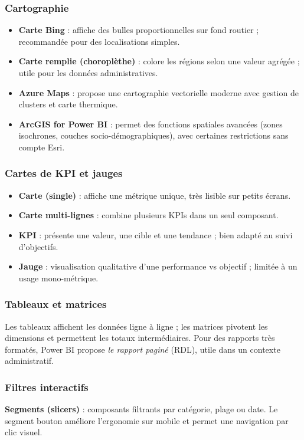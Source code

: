 \subsubsection{Cartographie}
\begin{itemize}
  \item \textbf{Carte Bing} : affiche des bulles proportionnelles sur fond routier ; recommandée pour des localisations simples.
  \item \textbf{Carte remplie (choroplèthe)} : colore les régions selon une valeur agrégée ; utile pour les données administratives.
  \item \textbf{Azure Maps} : propose une cartographie vectorielle moderne avec gestion de clusters et carte thermique.
  \item \textbf{ArcGIS for Power BI} : permet des fonctions spatiales avancées (zones isochrones, couches socio-démographiques), avec certaines restrictions sans compte Esri.
\end{itemize}

\subsubsection{Cartes de KPI et jauges}
\begin{itemize}
  \item \textbf{Carte (single)} : affiche une métrique unique, très lisible sur petits écrans.
  \item \textbf{Carte multi-lignes} : combine plusieurs KPIs dans un seul composant.
  \item \textbf{KPI} : présente une valeur, une cible et une tendance ; bien adapté au suivi d’objectifs.
  \item \textbf{Jauge} : visualisation qualitative d’une performance vs objectif ; limitée à un usage mono-métrique.
\end{itemize}

\subsubsection{Tableaux et matrices}
Les tableaux affichent les données ligne à ligne ; les matrices pivotent les dimensions et permettent les totaux intermédiaires. Pour des rapports très formatés, Power BI propose \emph{le rapport paginé} (RDL), utile dans un contexte administratif.

\subsubsection{Filtres interactifs}
\textbf{Segments (slicers)} : composants filtrants par catégorie, plage ou date. Le segment bouton améliore l’ergonomie sur mobile et permet une navigation par clic visuel.

